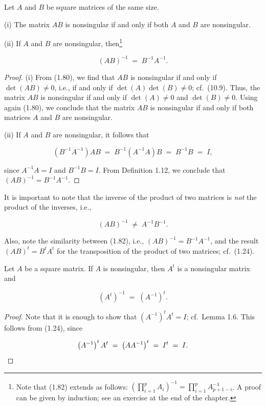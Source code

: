 \begin{lemma}
Let $A$ and $B$ be square matrices of the same size.

(i) The matrix $AB$ is nonsingular if and only if both $A$ and $B$ are
nonsingular.

(ii) If $A$ and $B$ are nonsingular, then\footnote{Note that (1.82)
extends as follows: $\left(\prod_{i=1}^{p}A_i\right)^{-1} =
\prod_{i=1}^{p}A_{p+1-i}^{-1}$. A proof can be given by induction; see an
exercise at the end of the chapter.}

\begin{equation}
(AB)^{-1} \;=\; B^{-1}A^{-1}.
\end{equation}
\end{lemma}

\begin{proof}
(i) From (1.80), we find that $AB$ is nonsingular if and only if
$\det(AB)\ne 0$, i.e., if and only if $\det(A)\det(B)\ne 0$; cf.\ (10.9).
Thus, the matrix $AB$ is nonsingular if and only if $\det(A)\ne 0$ and
$\det(B)\ne 0$. Using again (1.80), we conclude that the matrix $AB$ is
nonsingular if and only if both matrices $A$ and $B$ are nonsingular.

(ii) If $A$ and $B$ are nonsingular, it follows that

\[
\left(B^{-1}A^{-1}\right)AB \;=\; B^{-1}\left(A^{-1}A\right)B \;=\; B^{-1}B \;=\; I,
\]

since $A^{-1}A=I$ and $B^{-1}B=I$. From Definition 1.12, we conclude that
$(AB)^{-1}=B^{-1}A^{-1}$.
\end{proof}

It is important to note that the inverse of the product of two matrices
is \textit{not} the product of the inverses, i.e.,

\[
(AB)^{-1} \;\ne\; A^{-1}B^{-1}.
\]

Also, note the similarity between (1.82), i.e., $(AB)^{-1}=B^{-1}A^{-1}$,
and the result $(AB)^t=B^tA^t$ for the transposition of the product of
two matrices; cf.\ (1.24).

\begin{lemma}
Let $A$ be a square matrix. If $A$ is nonsingular, then $A^t$ is a
nonsingular matrix and

\begin{equation}
\left(A^t\right)^{-1} \;=\; \left(A^{-1}\right)^t.
\end{equation}
\end{lemma}

\begin{proof}
Note that it is enough to show that $\left(A^{-1}\right)^tA^t=I$; cf.\
Lemma 1.6. This follows from (1.24), since

\[
\left(A^{-1}\right)^tA^t \;=\; \left(AA^{-1}\right)^t \;=\; I^t \;=\; I. \qedhere
\]
\end{proof}

